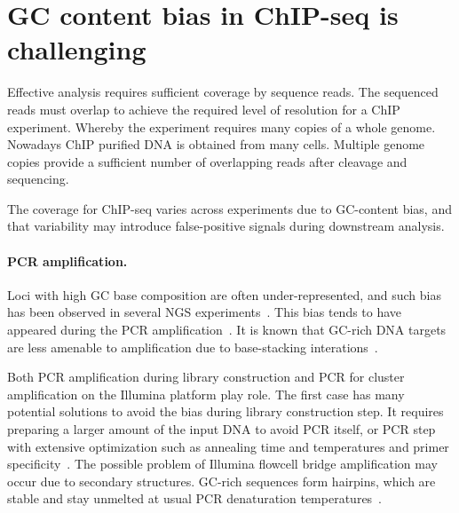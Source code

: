 \section{GC content bias in ChIP-seq is challenging}
\label{gc}

Effective analysis requires sufficient coverage by sequence reads. 
The sequenced reads must overlap to achieve the required level of resolution for a ChIP experiment.
Whereby the experiment requires many copies of a whole genome.
Nowadays ChIP purified DNA is obtained from many cells.
Multiple genome copies provide a sufficient number of overlapping reads after cleavage and sequencing.


The coverage for ChIP-seq varies across experiments due to GC-content bias, and that variability may introduce false-positive signals during downstream analysis.
\paragraph{PCR amplification.}
Loci with high GC base composition are often under-represented, and such bias has been observed in several NGS experiments~\cite{benjamini2012summarizing,dohm2008substantial,teng2017accounting}.
This bias tends to have appeared during the PCR amplification~\cite{ross2013characterizing}.
It is known that GC-rich DNA targets are less amenable to amplification due to base-stacking interations~\cite{yakovchuk2006base}.

Both PCR amplification during library construction and PCR for cluster amplification on the Illumina platform play role. 
The first case has many potential solutions to avoid the bias during library construction step.
It requires preparing a larger amount of the input DNA to avoid PCR itself, or PCR step with extensive optimization such as annealing time and temperatures and primer specificity~\cite{aird2011analyzing}.
The possible problem of Illumina flowcell bridge amplification may occur due to secondary structures.
GC-rich sequences form hairpins, which are stable and stay unmelted at usual PCR denaturation temperatures~\cite{stein2010nucleosome}.

